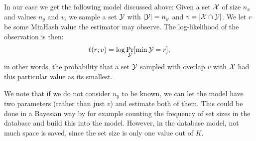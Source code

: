 
In our case we get the following model discussed above:
Given a set $\mathcal{X}$ of size $n_x$ and values $n_y$ and $v$, we sample a set $\mathcal{Y}$ with $|\mathcal{Y}|=n_y$ and $v=|\mathcal{X}\cap \mathcal{Y}|$.
We let $r$ be some MinHash value the estimator may observe.
The log-likelihood of the observation is then:
\[
   \ell(r; v) = \log\Pr_{\mathcal{Y}}[\min\mathcal{Y} = r],
\]
in other words, the probability that a set $\mathcal{Y}$ sampled with overlap $v$ with $\mathcal{X}$ had this particular value as its smallest.

We note that if we do not consider $n_y$ to be known, we can let the model have two parameters (rather than just $v$) and estimate both of them.
This could be done in a Bayesian way by for example counting the frequency of set sizes in the database and build this into the model.
However, in the database model, not much space is saved, since the set size is only one value out of $K$.

